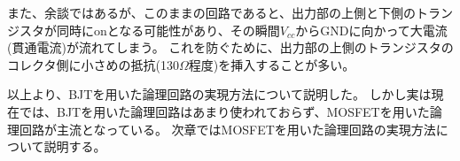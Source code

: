 また、余談ではあるが、このままの回路であると、出力部の上側と下側のトランジスタが同時にonとなる可能性があり、その瞬間$V_{cc}$からGNDに向かって大電流(貫通電流)が流れてしまう。
これを防ぐために、出力部の上側のトランジスタのコレクタ側に小さめの抵抗(130$\Omega$程度)を挿入することが多い。

以上より、BJTを用いた論理回路の実現方法について説明した。
しかし実は現在では、BJTを用いた論理回路はあまり使われておらず、MOSFETを用いた論理回路が主流となっている。
次章ではMOSFETを用いた論理回路の実現方法について説明する。


